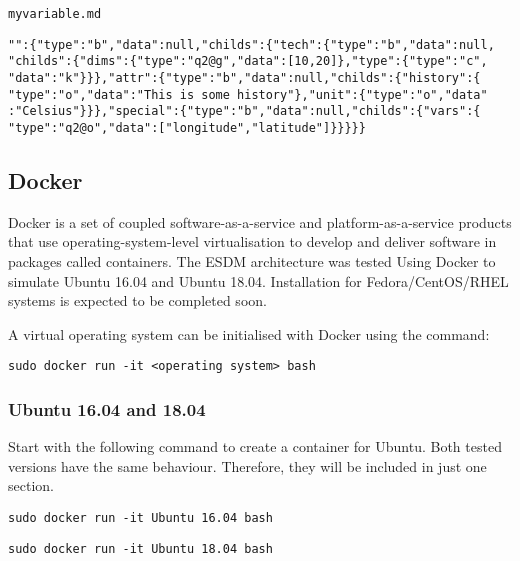 \begin{framed}

\texttt{myvariable.md}

\vspace*{-0.3cm}

\begin{verbatim}
"":{"type":"b","data":null,"childs":{"tech":{"type":"b","data":null,
"childs":{"dims":{"type":"q2@g","data":[10,20]},"type":{"type":"c",
"data":"k"}}},"attr":{"type":"b","data":null,"childs":{"history":{
"type":"o","data":"This is some history"},"unit":{"type":"o","data"
:"Celsius"}}},"special":{"type":"b","data":null,"childs":{"vars":{
"type":"q2@o","data":["longitude","latitude"]}}}}}
\end{verbatim}

\end{framed}

\subsection{Docker}
\label{doc:docker}

\tab
Docker is a set of coupled software-as-a-service and platform-as-a-service products that use operating-system-level virtualisation to develop and deliver software in packages called containers. The ESDM architecture was tested Using Docker to simulate Ubuntu 16.04 and Ubuntu 18.04. Installation for Fedora/CentOS/RHEL systems is expected to be completed soon.

A virtual operating system can be initialised with Docker using the command:

\begin{framed}

\texttt{sudo docker run -it <operating system> bash}

\end{framed}

\subsubsection{Ubuntu 16.04 and 18.04}

\tab
Start with the following command to create a container for Ubuntu. Both tested versions have the same behaviour. Therefore, they will be included in just one section.

\begin{framed}

\texttt{sudo docker run -it Ubuntu 16.04 bash}

\texttt{sudo docker run -it Ubuntu 18.04 bash}

\end{framed}

